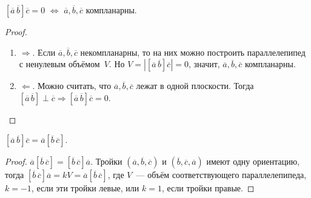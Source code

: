 \begin{center}\noindent
{}
\end{center}

\begin{statement}
$[\overline a\,\overline b] \overline c = 0$ $\Leftrightarrow$ $\overline a, \overline b, \overline c$ компланарны.
\end{statement}
\begin{proof}
\begin{enumerate}
	\item $\Rightarrow$. Если $\overline a, \overline b, \overline c$ некомпланарны, то на них можно построить параллелепипед с ненулевым объёмом~$V$.
	Но $V = |[\overline a\,\overline b] \overline c| = 0$, значит, $\overline a, \overline b, \overline c$ компланарны.
	
	\item $\Leftarrow$. Можно считать, что $\overline a, \overline b, \overline c$ лежат в одной плоскости.
	Тогда $[\overline a\,\overline b] \perp \overline c \Rightarrow
	[\overline a\,\overline b] \overline c = 0$.
\end{enumerate}
\end{proof}

\begin{statement}
$[\overline a\,\overline b] \overline c = \overline a [\overline b\,\overline c]$.
\end{statement}
\begin{proof}
$\overline a [\overline b\,\overline c] = [\overline b\,\overline c] \overline a$.
Тройки $(\overline a, \overline b, \overline c)$ и $(\overline b, \overline c, \overline a)$ имеют одну ориентацию, тогда $[\overline b\,\overline c] \overline a = kV = \overline a [\overline b\,\overline c]$, где $V$~--- объём соответствующего параллелепипеда, $k = -1$, если эти тройки левые, или $k = 1$, если тройки правые.
\end{proof}

